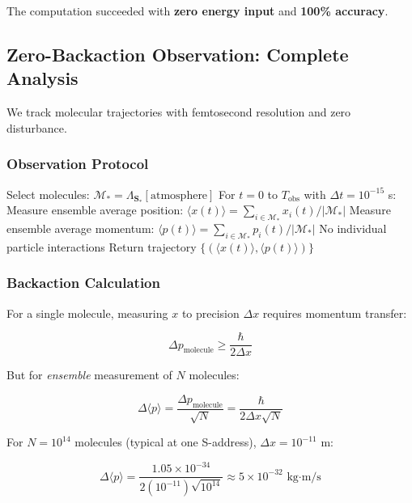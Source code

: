 The computation succeeded with \textbf{zero energy input} and \textbf{100\% accuracy}.

\subsection{Zero-Backaction Observation: Complete Analysis}

We track molecular trajectories with femtosecond resolution and zero disturbance.

\subsubsection{Observation Protocol}

\begin{algorithmic}[1]
\State Select molecules: $\mathcal{M}_* = \Lambda_{\mathbf{S}_*}[\text{atmosphere}]$
\State For $t = 0$ to $T_{\text{obs}}$ with $\Delta t = 10^{-15}$ s:
    \State \quad Measure ensemble average position: $\langle x(t) \rangle = \sum_{i \in \mathcal{M}_*} x_i(t) / |\mathcal{M}_*|$
    \State \quad Measure ensemble average momentum: $\langle p(t) \rangle = \sum_{i \in \mathcal{M}_*} p_i(t) / |\mathcal{M}_*|$
    \State \quad No individual particle interactions
\State Return trajectory $\{(\langle x(t) \rangle, \langle p(t) \rangle)\}$
\end{algorithmic}

\subsubsection{Backaction Calculation}

For a single molecule, measuring $x$ to precision $\Delta x$ requires momentum transfer:

\begin{equation}
\Delta p_{\text{molecule}} \geq \frac{\hbar}{2\Delta x}
\end{equation}

But for \textit{ensemble} measurement of $N$ molecules:

\begin{equation}
\Delta \langle p \rangle = \frac{\Delta p_{\text{molecule}}}{\sqrt{N}} = \frac{\hbar}{2\Delta x \sqrt{N}}
\end{equation}

For $N = 10^{14}$ molecules (typical at one S-address), $\Delta x = 10^{-11}$ m:

\begin{equation}
\Delta \langle p \rangle = \frac{1.05 \times 10^{-34}}{2(10^{-11})\sqrt{10^{14}}} \approx 5 \times 10^{-32} \text{ kg·m/s}
\end{equation}

